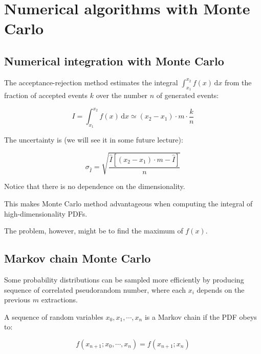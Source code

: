 

\section{Numerical algorithms with Monte Carlo}
\label{sec:numerical_monte_carlo}

\subsection{Numerical integration with Monte Carlo}
\label{subsec:numerical_int}

The acceptance-rejection method estimates the integral $\int_{x_{1}}^{x_{2}}{f(x)} \,\mathrm{d}x$ from the fraction of accepted events $k$ over the number $n$ of generated events:

\begin{equation}\label{eq:numerical_int}
	I = \int_{x_{1}}^{x_{2}}{f(x)} \,\mathrm{d}x \simeq (x_{2} - x_{1}) \cdot m \cdot \frac{k}{n}
\end{equation}

The uncertainty is (we will see it in some future lecture):

\begin{equation}\label{eq:uncertainty_of_numerical_int}
	\sigma_{\hat{I}} = \sqrt{\frac{\hat{I} \left[ (x_{2} - x_{1}) \cdot m - \hat{I} \right]}{n}}
\end{equation}

Notice that there is no dependence on the dimensionality.

This makes Monte Carlo method advantageous when computing the integral of high-dimensionality PDFs.

The problem, however, might be to find the maximum of $f(x)$.

\subsection{Markov chain Monte Carlo}
\label{subsec:mcmc}

Some probability distributions can be sampled more efficiently by producing sequence of correlated pseudorandom number, where each $x_{i}$ depends on the previous $m$ extractions.

A sequence of random variables $x_{0}, x_{1}, \cdots, x_{n}$ is a Markov chain if the PDF obeys to:

\begin{equation}\label{eq:mcmc_pdf}
	f(x_{n + 1} ; x_{0}, \cdots, x_{n}) = f(x_{n + 1} ; x_{n})
\end{equation}

